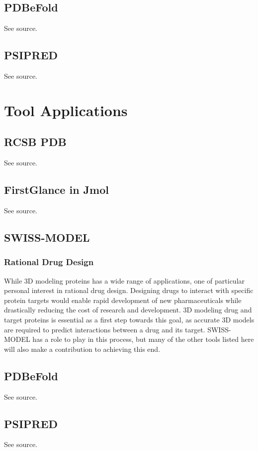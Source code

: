     \subsection{PDBeFold}

    See source.\autocite{B16}

    \subsection{PSIPRED}

    See source.\autocite{B17}

\section{Tool Applications}

    \subsection{RCSB PDB}

    See source.\autocite{B13}

    \subsection{FirstGlance in Jmol}

    See source. \autocite{B14}

    \subsection{SWISS-MODEL}

        \subsubsection{Rational Drug Design}

        While 3D modeling proteins has a wide range of applications, one of particular personal interest in rational drug design. Designing drugs to interact with specific protein targets would enable rapid development of new pharmaceuticals while drastically reducing the cost of research and development.\autocite{L7} 3D modeling drug and target proteins is essential as a first step towards this goal, as accurate 3D models are required to predict interactions between a drug and its target. SWISS-MODEL has a role to play in this process, but many of the other tools listed here will also make a contribution to achieving this end.\autocite{L7}

    \subsection{PDBeFold}

    See source.\autocite{B16}

    \subsection{PSIPRED}

    See source. \autocite{B17}